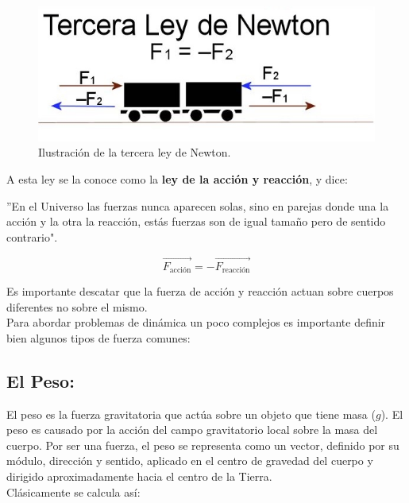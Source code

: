 \documentclass[a5paper,pagesize,10pt,bibtotoc,pointlessnumbers,
normalheadings,DIV=9,fleqn,x11names,table,twoside=false]{scrbook}
\begin{document}
\begin{figure}[ht]
 \centering
 \includegraphics[scale=0.5]{images/tercera-ley-de-newton.jpg}
 \caption{Ilustración de la tercera ley de Newton.}\label{ac}
\end{figure}

A esta ley se la conoce como la \textbf{ley de la acción y reacción}, y dice:

\begin{tcolorbox}
''En el Universo las fuerzas nunca aparecen solas, sino en parejas donde una la acción y la otra la reacción, estás fuerzas son 
de igual tamaño pero de sentido contrario".
\end{tcolorbox}

\begin{equation}
\vec{F_{\text{acción}}} = -\vec{F_{\text{reacción}}}
\end{equation}

Es importante descatar que la fuerza de acción y reacción actuan sobre cuerpos diferentes no sobre el mismo.\\

Para abordar problemas de dinámica un poco complejos es importante definir bien algunos tipos de fuerza comunes:

\subsection{El Peso:}

El peso es la fuerza gravitatoria que actúa sobre un objeto que tiene masa ($g$). El peso es causado por la acción del campo 
gravitatorio local sobre la masa del cuerpo. Por ser una fuerza, el peso se representa como un vector, definido por su módulo, 
dirección y sentido, aplicado en el centro de gravedad del cuerpo y dirigido aproximadamente hacia el centro de la Tierra.\\

Clásicamente se calcula así:
\end{document}
